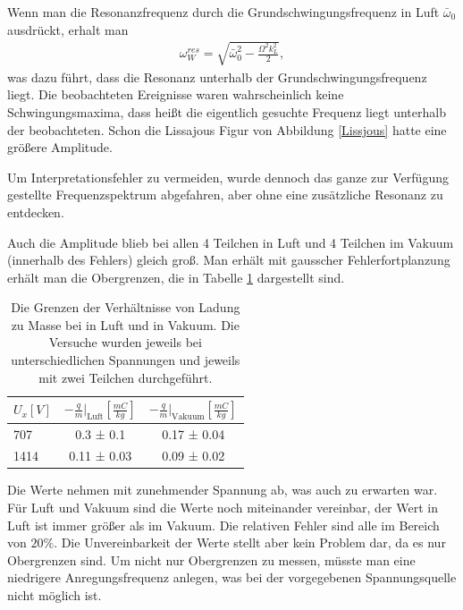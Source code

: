\documentclass[a4paper,12pt]{article}
\begin{document}
Wenn man die Resonanzfrequenz durch die Grundschwingungsfrequenz in Luft $\bar{ω}_0$ ausdrückt, erhalt man
\begin{align*}
	ω^{res}_W = \sqrt{ \bar{ω}_0^2 - \frac{Ω^2k_L^2}{2} },
\end{align*}
was dazu führt, dass die Resonanz unterhalb der Grundschwingungsfrequenz liegt.
Die beobachteten Ereignisse waren wahrscheinlich keine Schwingungsmaxima, dass heißt die eigentlich gesuchte Frequenz liegt unterhalb der beobachteten.
Schon die Lissajous Figur von Abbildung \ref{Lissjous} hatte eine größere Amplitude.

Um Interpretationsfehler zu vermeiden, wurde dennoch das ganze zur Verfügung gestellte Frequenzspektrum abgefahren, aber ohne eine zusätzliche Resonanz zu entdecken.

Auch die Amplitude blieb bei allen 4 Teilchen in Luft und 4 Teilchen im Vakuum (innerhalb des Fehlers) gleich groß.
Man erhält mit gausscher Fehlerfortplanzung erhält man die Obergrenzen, die in Tabelle \ref{tab:resonanz} dargestellt sind.

\begin{table}[h]
	\centering
	\begin{tabular}{l|c|c}
		$U_x \unit{[V]}$ & $-\frac{q}{m}|_\text{Luft}\unit{\left[\frac{mC}{kg}\right]} $&$-\frac{q}{m}|_\text{Vakuum}\unit{\left[\frac{mC}{kg}\right]}$\\
		\hline
		707 & 0.3 ± 0.1 &  0.17 ± 0.04 \\
		1414 & 0.11 ± 0.03 & 0.09 ± 0.02
	\end{tabular}
	\caption{Die Grenzen der Verhältnisse von Ladung zu Masse bei in Luft und in Vakuum.
		Die Versuche wurden jeweils bei unterschiedlichen Spannungen und jeweils mit zwei Teilchen durchgeführt.}
	\label{tab:resonanz}
\end{table}

Die Werte nehmen mit zunehmender Spannung ab, was auch zu erwarten war.
Für Luft und Vakuum sind die Werte noch  miteinander vereinbar, der Wert in Luft ist immer größer als im Vakuum.
Die relativen Fehler sind alle im Bereich von $20\%$.
Die Unvereinbarkeit der Werte stellt aber  kein Problem dar,
da es nur Obergrenzen sind. Um nicht nur Obergrenzen zu messen,
müsste man eine niedrigere Anregungsfrequenz anlegen, was bei der vorgegebenen
Spannungsquelle nicht möglich ist.
\end{document}
